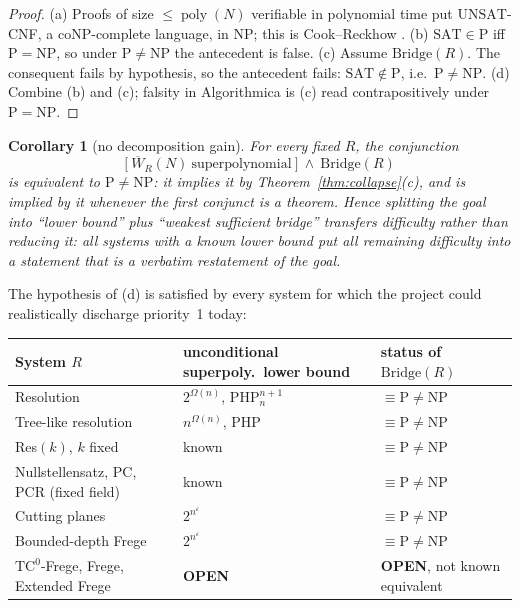 \documentclass[11pt]{article}
\newtheorem{corollary}[theorem]{Corollary}
\theoremstyle{definition}
\newcommand{\poly}{\operatorname{poly}}
\newcommand{\UNSAT}{\mathrm{UNSAT}}
\newcommand{\Wbar}{\overline W}
\begin{document}
\begin{proof}
(a) Proofs of size $\le\poly(N)$ verifiable in polynomial time put
$\UNSAT$-CNF, a coNP-complete language, in NP; this is Cook--Reckhow
\cite{cookreckhow79}. (b) $\mathrm{SAT}\in\mathrm P$ iff
$\mathrm P=\mathrm{NP}$, so under $\mathrm P\neq\mathrm{NP}$ the antecedent is
false. (c) Assume $\mathrm{Bridge}(R)$. The consequent fails by hypothesis, so
the antecedent fails: $\mathrm{SAT}\notin\mathrm P$, i.e.\
$\mathrm P\neq\mathrm{NP}$. (d) Combine (b) and (c); falsity in Algorithmica is
(c) read contrapositively under $\mathrm P=\mathrm{NP}$.
\end{proof}

\begin{corollary}[no decomposition gain]\label{cor:nogain}
For every fixed $R$, the conjunction
\[
 \bigl[\ \Wbar_R(N)\ \text{superpolynomial}\ \bigr]\ \wedge\ \mathrm{Bridge}(R)
\]
is equivalent to $\mathrm P\neq\mathrm{NP}$: it implies it by
Theorem~\ref{thm:collapse}(c), and is implied by it whenever the first
conjunct is a theorem. Hence splitting the goal into ``lower bound'' plus
``weakest sufficient bridge'' transfers difficulty rather than reducing it:
all systems with a known lower bound put \emph{all} remaining difficulty into
a statement that is a verbatim restatement of the goal.
\end{corollary}

\noindent The hypothesis of (d) is satisfied by every system for which the
project could realistically discharge priority~1 today:

\begin{center}
\begin{tabular}{@{}lll@{}}
\toprule
System $R$ & unconditional superpoly.\ lower bound & status of $\mathrm{Bridge}(R)$\\
\midrule
Resolution & $2^{\Omega(n)}$, $\mathrm{PHP}^{n+1}_n$ \cite{haken85} & $\equiv \mathrm P\neq\mathrm{NP}$\\
Tree-like resolution & $n^{\Omega(n)}$, $\mathrm{PHP}$ \cite{dantchevriis01} & $\equiv \mathrm P\neq\mathrm{NP}$\\
Res$(k)$, $k$ fixed & known & $\equiv \mathrm P\neq\mathrm{NP}$\\
Nullstellensatz, PC, PCR (fixed field) & known & $\equiv \mathrm P\neq\mathrm{NP}$\\
Cutting planes & $2^{n^{\varepsilon}}$ \cite{pudlak97} & $\equiv \mathrm P\neq\mathrm{NP}$\\
Bounded-depth Frege & $2^{n^{\varepsilon}}$ \cite{ajtai94,pbi93} & $\equiv \mathrm P\neq\mathrm{NP}$\\
\midrule
$\mathrm{TC}^0$-Frege, Frege, Extended Frege & \textbf{OPEN} & \textbf{OPEN}, not known equivalent\\
\bottomrule
\end{tabular}
\end{center}
\end{document}
